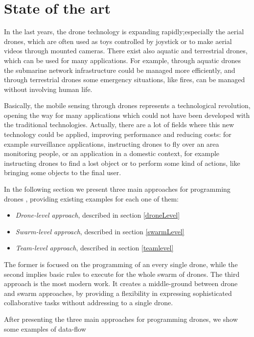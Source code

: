 \chapter{State of the art}
\label{cap2}

In the last years, the drone technology is expanding rapidly;especially the aerial drones, which are often used as toys controlled by joystick  or to make aerial videos through mounted cameras.
There exist also aquatic and terrestrial drones, which can be used for many applications. 
For example, through aquatic drones the submarine network infrastructure\cite{submarine} could be managed more efficiently, and through terrestrial drones some emergency situations, like fires, can be managed without involving human life.

Basically, the mobile sensing through drones represents a technological revolution, opening the way for many applications which could not have been developed with the traditional technologies.
Actually, there are a lot of fields where this new technology could be applied, improving performance and reducing costs:
for example surveillance applications, instructing drones to fly over an area monitoring people, or an application in a domestic context, for example instructing drones to find a lost object or to perform some kind of actions, like bringing some objects to the final user.

In the following section we present three main approaches for programming drones , providing existing examples for each one of them:

\begin{itemize}
\itemsep2pt
\item{
\textit{Drone-level approach}, described in section \ref{droneLevel}
}
\item{
\textit{Swarm-level approach}, described in section \ref{swarmLevel}
}
\item{
\textit{Team-level approach}, described in section \ref{teamlevel}
}
\end{itemize}

The former is focused on the programming of an every single drone, while the second implies basic rules to execute for the whole swarm of drones. The third approach is the most modern work. It creates a middle-ground between drone and swarm approaches, by providing a flexibility in expressing sophisticated collaborative tasks without addressing to a single drone.

After presenting the three main approaches for programming drones, we show some examples of data-flow


